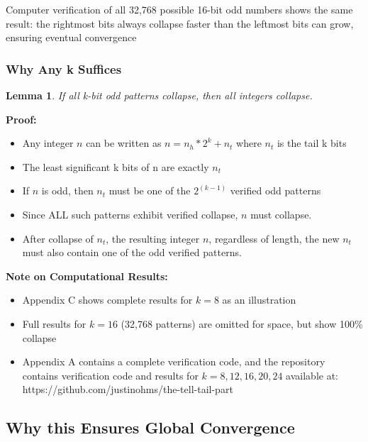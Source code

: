 \documentclass[10pt,letterpaper]{article}
\newtheorem{lemma}{Lemma}
\begin{document}
\vspace{1em}

Computer verification of all 32,768 possible 16-bit odd numbers shows the same result: the rightmost bits always collapse faster than the leftmost bits can grow, ensuring eventual convergence

\subsubsection{Why Any k Suffices}
\begin{lemma}
    If all k-bit odd patterns collapse, then all integers collapse.
\end{lemma}

\textbf{Proof:}

\begin{itemize}
    \item Any integer $n$ can be written as $n = n_h * 2^k + n_t$ where $n_t$ is the tail k bits
    \item The least significant k bits of n are exactly $n_t$
    \item If $n$ is odd, then $n_t$ must be one of the $2^{(k-1)}$ verified odd patterns
    \item Since ALL such patterns exhibit verified collapse, $n$ must collapse.  
    \item After collapse of $n_t$, the resulting integer $n$, regardless of length, the new $n_t$ must also contain one of the odd verified patterns.
\end{itemize}

\vspace{1em}

\newpage

\textbf{Note on Computational Results:}
\begin{itemize}
    \item Appendix C shows complete results for $k=8$ as an illustration
    \item Full results for $k=16$ (32,768 patterns) are omitted for space, but show 100\% collapse
    \item Appendix A contains a complete verification code, and the repository contains verification code and results for $k=8,12,16,20,24$ available at: https://github.com/justinohms/the-tell-tail-part
\end{itemize}


\subsection{Why this Ensures Global Convergence}
\end{document}
